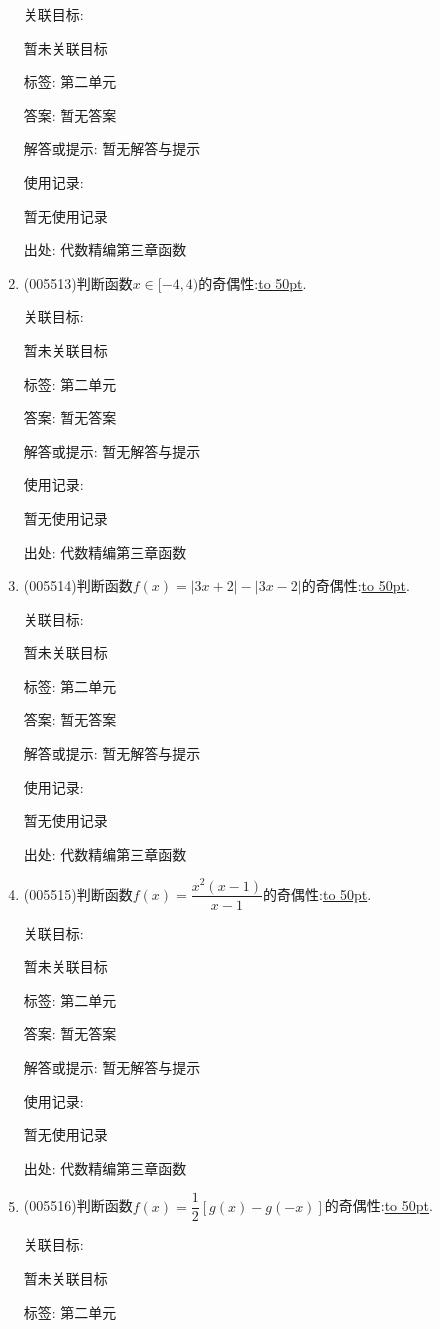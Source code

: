 \documentclass[10pt,a4paper]{article}
\newcommand{\blank}[1]{\underline{\hbox to #1pt{}}}
\begin{document}
\begin{enumerate}[1.]
关联目标:

暂未关联目标



标签: 第二单元

答案: 暂无答案

解答或提示: 暂无解答与提示

使用记录:

暂无使用记录


出处: 代数精编第三章函数
\item { (005513)}判断函数$x\in [-4,4)$的奇偶性:\blank{50}.


关联目标:

暂未关联目标



标签: 第二单元

答案: 暂无答案

解答或提示: 暂无解答与提示

使用记录:

暂无使用记录


出处: 代数精编第三章函数
\item { (005514)}判断函数$f(x)=|3x+2|-|3x-2|$的奇偶性:\blank{50}.


关联目标:

暂未关联目标



标签: 第二单元

答案: 暂无答案

解答或提示: 暂无解答与提示

使用记录:

暂无使用记录


出处: 代数精编第三章函数
\item { (005515)}判断函数$f(x)=\dfrac{x^2(x-1)}{x-1}$的奇偶性:\blank{50}.


关联目标:

暂未关联目标



标签: 第二单元

答案: 暂无答案

解答或提示: 暂无解答与提示

使用记录:

暂无使用记录


出处: 代数精编第三章函数
\item { (005516)}判断函数$f(x)=\dfrac 12[g(x)-g(-x)]$的奇偶性:\blank{50}.


关联目标:

暂未关联目标



标签: 第二单元


\end{enumerate}
\end{document}
